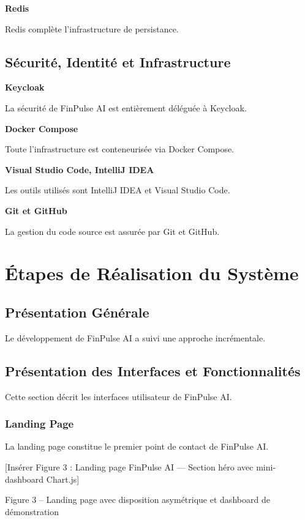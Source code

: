 \textbf{Redis}

Redis complète l'infrastructure de persistance.

\subsection{Sécurité, Identité et Infrastructure}

\textbf{Keycloak}

La sécurité de FinPulse AI est entièrement déléguée à Keycloak.

\textbf{Docker Compose}

Toute l'infrastructure est conteneurisée via Docker Compose.

\textbf{Visual Studio Code, IntelliJ IDEA}

Les outils utilisés sont IntelliJ IDEA et Visual Studio Code.

\textbf{Git et GitHub}

La gestion du code source est assurée par Git et GitHub.

\section{Étapes de Réalisation du Système}

\subsection{Présentation Générale}

Le développement de FinPulse AI a suivi une approche incrémentale.

\subsection{Présentation des Interfaces et Fonctionnalités}

Cette section décrit les interfaces utilisateur de FinPulse AI.

\subsubsection{Landing Page}

La landing page constitue le premier point de contact de FinPulse AI.

[Insérer Figure 3 : Landing page FinPulse AI — Section héro avec mini-dashboard Chart.js]

Figure 3 – Landing page avec disposition asymétrique et dashboard de démonstration


